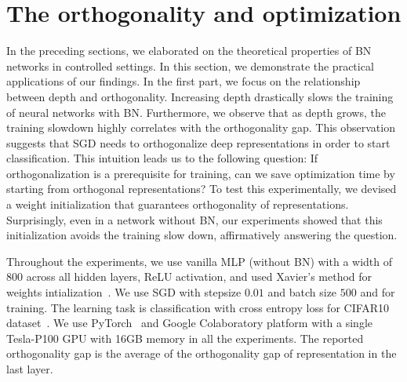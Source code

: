 
\section{The orthogonality and optimization}
\label{ortho:sec:optimization}
In the preceding sections, we elaborated on the theoretical properties of BN networks in controlled settings. 
In this section, we demonstrate the practical applications of our findings. In the first part, we focus on the relationship between depth and orthogonality. Increasing depth drastically slows the training of neural networks with BN. Furthermore, we observe that as depth grows, the training slowdown highly correlates with the orthogonality gap. This observation suggests that SGD needs to orthogonalize deep representations in order to start classification. This intuition leads us to the following question: If orthogonalization is a prerequisite for training, can we save optimization time by starting from orthogonal representations? To test this experimentally, we devised a weight initialization that guarantees orthogonality of representations. Surprisingly, even in a network without BN, our experiments showed that this initialization avoids the training slow down, affirmatively answering the question. 

Throughout the experiments, we use vanilla MLP (without BN) with a width of 800 across all hidden layers, ReLU activation, and used Xavier's method for weights intialization~\citep{glorot2010understanding}. We use SGD with stepsize $0.01$ and batch size $500$ and for training. The learning task is classification with cross entropy loss for CIFAR10 dataset~\citep[][MIT license]{krizhevsky2009learning}. We use PyTorch~\citep[][BSD license]{NEURIPS2019_9015} and Google Colaboratory platform with a single Tesla-P100 GPU with 16GB memory in all the experiments. The reported orthogonality gap is the average of the orthogonality gap of representation in the last layer.


